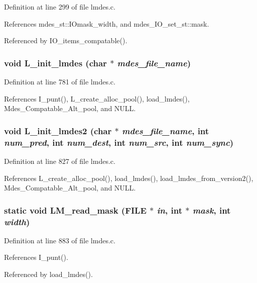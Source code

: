 Definition at line 299 of file lmdes.c.

References mdes\_\-st::IOmask\_\-width, and mdes\_\-IO\_\-set\_\-st::mask.

Referenced by IO\_\-items\_\-compatable().
\subsubsection{\setlength{\rightskip}{0pt plus 5cm}void L\_\-init\_\-lmdes (char $\ast$ {\em mdes\_\-file\_\-name})}\label{lmdes_8c_8a5b297b5c6aff02e81706246fe2b37d}




Definition at line 781 of file lmdes.c.

References I\_\-punt(), L\_\-create\_\-alloc\_\-pool(), load\_\-lmdes(), Mdes\_\-Compatable\_\-Alt\_\-pool, and NULL.
\subsubsection{\setlength{\rightskip}{0pt plus 5cm}void L\_\-init\_\-lmdes2 (char $\ast$ {\em mdes\_\-file\_\-name}, int {\em num\_\-pred}, int {\em num\_\-dest}, int {\em num\_\-src}, int {\em num\_\-sync})}\label{lmdes_8c_31b24a9481d90385d7406c58673a53d1}




Definition at line 827 of file lmdes.c.

References L\_\-create\_\-alloc\_\-pool(), load\_\-lmdes(), load\_\-lmdes\_\-from\_\-version2(), Mdes\_\-Compatable\_\-Alt\_\-pool, and NULL.
\subsubsection{\setlength{\rightskip}{0pt plus 5cm}static void LM\_\-read\_\-mask (FILE $\ast$ {\em in}, int $\ast$ {\em mask}, int {\em width})\hspace{0.3cm}{\tt  [static]}}\label{lmdes_8c_3a8a33a51509bf442b189ed800731cdf}




Definition at line 883 of file lmdes.c.

References I\_\-punt().

Referenced by load\_\-lmdes().
